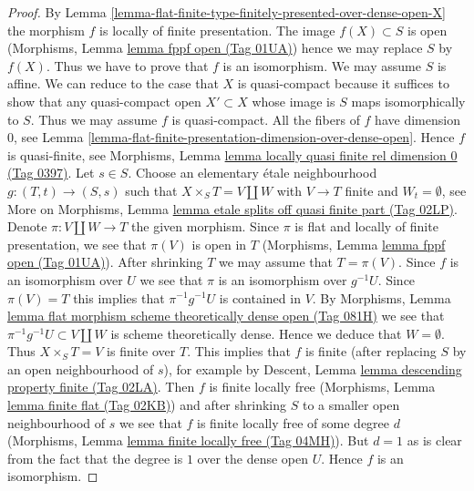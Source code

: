 \documentclass{amsart}
\theoremstyle{plain}
\theoremstyle{definition}
\theoremstyle{remark}
\numberwithin{equation}{subsection}
\begin{document}
\begin{proof}
By Lemma \ref{lemma-flat-finite-type-finitely-presented-over-dense-open-X}
the morphism $f$ is locally of finite presentation.
The image $f(X) \subset S$ is open
(Morphisms, Lemma \href{https://stacks.math.columbia.edu/tag/01UA}{lemma fppf open (Tag 01UA)})
hence we may replace $S$ by $f(X)$. Thus we have to prove that
$f$ is an isomorphism. We may assume $S$ is affine. We can reduce
to the case that $X$ is quasi-compact because it suffices to show
that any quasi-compact open $X' \subset X$ whose image is $S$
maps isomorphically to $S$. Thus we may assume $f$ is quasi-compact.
All the fibers of $f$ have dimension $0$, see
Lemma \ref{lemma-flat-finite-presentation-dimension-over-dense-open}.
Hence $f$ is quasi-finite, see
Morphisms, Lemma \href{https://stacks.math.columbia.edu/tag/0397}{lemma locally quasi finite rel dimension 0 (Tag 0397)}.
Let $s \in S$. Choose an elementary \'etale
neighbourhood $g : (T, t) \to (S, s)$ such that $X \times_S T = V \amalg W$
with $V \to T$ finite and $W_t = \emptyset$, see
More on Morphisms, Lemma
\href{https://stacks.math.columbia.edu/tag/02LP}{lemma etale splits off quasi finite part (Tag 02LP)}.
Denote $\pi : V \amalg W \to T$ the given morphism. Since $\pi$ is
flat and locally of finite presentation, we see that $\pi(V)$ is
open in $T$ (Morphisms, Lemma \href{https://stacks.math.columbia.edu/tag/01UA}{lemma fppf open (Tag 01UA)}).
After shrinking $T$ we may assume that $T = \pi(V)$.
Since $f$ is an isomorphism over $U$ we see that $\pi$ is an
isomorphism over $g^{-1}U$. Since $\pi(V) = T$ this implies
that $\pi^{-1}g^{-1}U$ is contained in $V$.
By Morphisms, Lemma
\href{https://stacks.math.columbia.edu/tag/081H}{lemma flat morphism scheme theoretically dense open (Tag 081H)}
we see that $\pi^{-1}g^{-1}U \subset V \amalg W$ is scheme theoretically
dense. Hence we deduce that $W = \emptyset$.
Thus $X \times_S T = V$ is finite over $T$.
This implies that $f$ is finite (after replacing $S$ by an
open neighbourhood of $s$), for example by
Descent, Lemma \href{https://stacks.math.columbia.edu/tag/02LA}{lemma descending property finite (Tag 02LA)}.
Then $f$ is finite locally free
(Morphisms, Lemma \href{https://stacks.math.columbia.edu/tag/02KB}{lemma finite flat (Tag 02KB)})
and after shrinking $S$ to a smaller open neighbourhood of $s$
we see that $f$ is finite locally free of some degree $d$
(Morphisms, Lemma \href{https://stacks.math.columbia.edu/tag/04MH}{lemma finite locally free (Tag 04MH)}).
But $d = 1$ as is clear from the fact that the degree is $1$ over
the dense open $U$. Hence $f$ is an isomorphism.
\end{proof}
\end{document}
